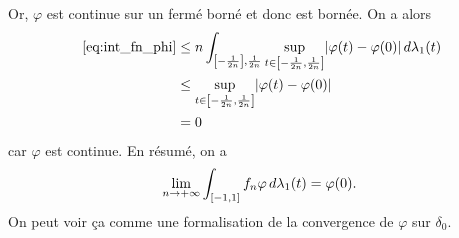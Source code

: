 {\begin{td-sol}[]
\begin{enumerate}
            Or, \(\varphi\) est continue sur un fermé borné et donc est bornée. On a alors
            \begin{equation*}
                \begin{aligned}
                    ~\eqref{eq:int_fn_phi} 
                    &\leq n\int_{\mathopen{}\left[-\frac{1}{2n}\right]\mathclose{},\frac{1}{2n}} \sup_{t\in\mathopen{}\left[-\frac{1}{2n},\frac{1}{2n}\right]\mathclose{}}\mathopen{}\left|\varphi(t) - \varphi(0)\right|\mathclose{}\mathop{}\!{d}\lambda_1(t) \\
                    &\leq \sup_{t\in\mathopen{}\left[-\frac{1}{2n},\frac{1}{2n}\right]\mathclose{}}\mathopen{}\left|\varphi(t) - \varphi(0)\right|\mathclose{}\\
                    &= 0
                \end{aligned}
            \end{equation*}
            car \(\varphi\) est continue. En résumé, on a
            \begin{equation*}
                \lim_{n\to+\infty}\int_{\mathopen{}\left[-1,1\right]\mathclose{}}f_n\varphi\mathop{}\!{d}\lambda_1(t) = \varphi(0).
            \end{equation*}
            On peut voir ça comme une formalisation de la convergence de \(\varphi\) sur \(\delta_0\).
            
        \end{enumerate}
    \end{td-sol}
}{}

